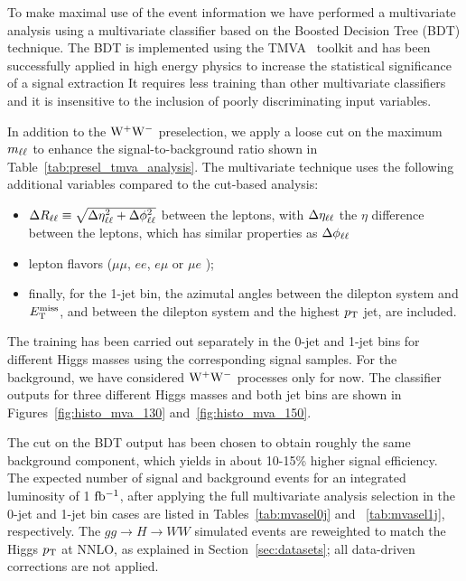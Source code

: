 To make maximal use of the event information we have performed a multivariate analysis 
using a multivariate classifier based on the Boosted Decision Tree (BDT) technique. 
The BDT is implemented using the TMVA~\cite{tmva} toolkit and has been 
successfully applied in high energy physics to increase the 
statistical significance of a signal extraction
It requires less training than other multivariate classifiers and 
it is insensitive to the inclusion of poorly discriminating input variables.

In addition to the $\mathrm{W}^+\mathrm{W}^-$ preselection, we apply a loose cut on the
maximum $m_{\ell\ell}$ to enhance the signal-to-background ratio shown in Table~\ref{tab:presel_tmva_analysis}. 
The multivariate technique uses the following additional variables compared to the cut-based analysis: 
\begin{itemize}
\item $\Delta R_{\ell\ell}\equiv\sqrt{\Delta\eta_{\ell\ell}^2 + \Delta\phi_{\ell\ell}^2}$ between the leptons, 
with $\Delta\eta_{\ell\ell}$ the $\eta$ difference between the leptons, 
which has similar properties as $\Delta\phi_{\ell\ell}$
\item lepton flavors ($\mu\mu$, $ee$, $e\mu$ or $\mu e$ );
\item finally, for the 1-jet bin, the azimutal angles between the dilepton 
system and $E_\mathrm{T}^{\mathrm{miss}}$, and between the dilepton system and the 
highest $p_\mathrm{T}$ jet, are included.
\end{itemize}

The training has been carried out separately in the 0-jet and 1-jet bins 
for different Higgs masses using the corresponding signal samples. For the background, 
we have considered $\mathrm{W}^+\mathrm{W}^-$ processes only for now. The classifier outputs 
for three different Higgs masses and both jet bins are shown in 
Figures~\ref{fig:histo_mva_130} and~\ref{fig:histo_mva_150}. 

The cut on the BDT output has been chosen to obtain roughly the same 
background component, which yields in about 10-15\% higher signal 
efficiency. 
The expected number of signal and background events for an integrated luminosity 
of 1 $\mathrm{fb^{-1}}$, after applying the full multivariate analysis selection in the 0-jet and 1-jet 
bin cases are listed in Tables~\ref{tab:mvasel0j} and ~\ref{tab:mvasel1j}, respectively. 
The $gg \to H \to WW$ simulated events are reweighted to match the Higgs $p_\mathrm{T}$ at NNLO, 
as explained in Section~\ref{sec:datasets}; all data-driven corrections are not applied.


